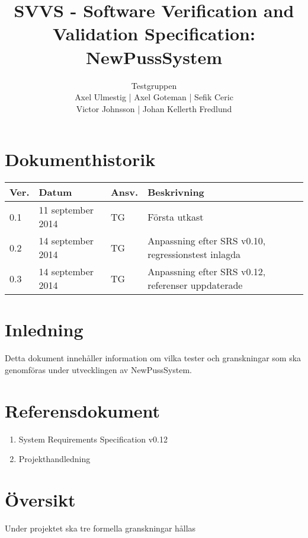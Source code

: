 \documentclass[a4paper]{article}
\title{SVVS - Software Verification and Validation Specification: NewPussSystem}
\author{Testgruppen \\ Axel Ulmestig | Axel Goteman | Sefik Ceric \\ Victor Johnsson | Johan Kellerth Fredlund}
\date{}
\begin{document}
\maketitle
\thispagestyle{fancy}
\tableofcontents
\newpage

\section*{Dokumenthistorik}

\begin{tabular}{ l l l l }
Ver. & Datum & Ansv. & Beskrivning \\\hline
0.1 & 11 september 2014 & TG & Första utkast \\
0.2 & 14 september 2014 & TG & Anpassning efter SRS v0.10, regressionstest inlagda \\
0.3 & 14 september 2014 & TG & Anpassning efter SRS v0.12, referenser uppdaterade \\

\end{tabular}
\section{Inledning}       

Detta dokument innehåller information om vilka tester och granskningar som ska genomföras under utvecklingen av NewPussSystem.

\section{Referensdokument}
\begin{enumerate}
\item System Requirements Specification v0.12
\item Projekthandledning
\end{enumerate}

\section{Översikt}

Under projektet ska tre formella granskningar hållas
\end{document}
